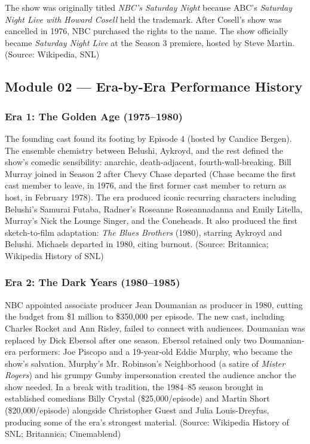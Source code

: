 \documentclass[11pt,letterpaper]{article}
\begin{document}
The show was originally titled \textit{NBC's Saturday Night} because ABC's \textit{Saturday Night Live with Howard Cosell} held the trademark. After Cosell's show was cancelled in 1976, NBC purchased the rights to the name. The show officially became \textit{Saturday Night Live} at the Season 3 premiere, hosted by Steve Martin. (Source: Wikipedia, SNL)

\subsection{Module 02 --- Era-by-Era Performance History}

\subsubsection{Era 1: The Golden Age (1975--1980)}

The founding cast found its footing by Episode 4 (hosted by Candice Bergen). The ensemble chemistry between Belushi, Aykroyd, and the rest defined the show's comedic sensibility: anarchic, death-adjacent, fourth-wall-breaking. Bill Murray joined in Season 2 after Chevy Chase departed (Chase became the first cast member to leave, in 1976, and the first former cast member to return as host, in February 1978). The era produced iconic recurring characters including Belushi's Samurai Futaba, Radner's Roseanne Roseannadanna and Emily Litella, Murray's Nick the Lounge Singer, and the Coneheads. It also produced the first sketch-to-film adaptation: \textit{The Blues Brothers} (1980), starring Aykroyd and Belushi. Michaels departed in 1980, citing burnout. (Source: Britannica; Wikipedia History of SNL)

\subsubsection{Era 2: The Dark Years (1980--1985)}

NBC appointed associate producer Jean Doumanian as producer in 1980, cutting the budget from \$1 million to \$350,000 per episode. The new cast, including Charles Rocket and Ann Risley, failed to connect with audiences. Doumanian was replaced by Dick Ebersol after one season. Ebersol retained only two Doumanian-era performers: Joe Piscopo and a 19-year-old Eddie Murphy, who became the show's salvation. Murphy's Mr. Robinson's Neighborhood (a satire of \textit{Mister Rogers}) and his grumpy Gumby impersonation created the audience anchor the show needed. In a break with tradition, the 1984--85 season brought in established comedians Billy Crystal (\$25,000/episode) and Martin Short (\$20,000/episode) alongside Christopher Guest and Julia Louis-Dreyfus, producing some of the era's strongest material. (Source: Wikipedia History of SNL; Britannica; Cinemablend)
\end{document}
